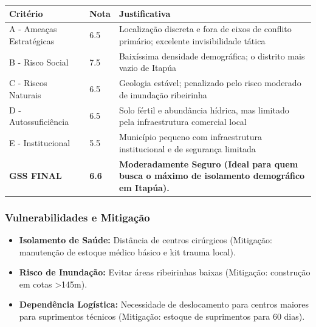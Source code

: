 \begin{table}[ht!]
\small \begin{tabular}{p{3.0cm}p{0.8cm}p{6.0cm}} \toprule
\textbf{Critério} & \textbf{Nota} & \textbf{Justificativa} \\ \midrule
A - Ameaças Estratégicas & 6.5 & Localização discreta e fora de eixos de conflito primário; excelente invisibilidade tática \\
B - Risco Social & 7.5 & Baixíssima densidade demográfica; o distrito mais vazio de Itapúa \\
C - Riscos Naturais & 6.5 & Geologia estável; penalizado pelo risco moderado de inundação ribeirinha \\
D - Autossuficiência & 6.5 & Solo fértil e abundância hídrica, mas limitado pela infraestrutura comercial local \\
E - Institucional & 5.5 & Município pequeno com infraestrutura institucional e de segurança limitada \\
\midrule \textbf{GSS FINAL} & \textbf{6.6} & \textbf{Moderadamente Seguro (Ideal para quem busca o máximo de isolamento demográfico em Itapúa).} \\ \bottomrule \end{tabular}
\end{table}
\subsubsection{Vulnerabilidades e
Mitigação}

\begin{itemize}
\tightlist
\item
  \textbf{Isolamento de Saúde:} Distância de centros cirúrgicos
  (Mitigação: manutenção de estoque médico básico e kit trauma local).
\item
  \textbf{Risco de Inundação:} Evitar áreas ribeirinhas baixas
  (Mitigação: construção em cotas \textgreater145m).
\item
  \textbf{Dependência Logística:} Necessidade de deslocamento para
  centros maiores para suprimentos técnicos (Mitigação: estoque de
  suprimentos para 60 dias).
\end{itemize}

